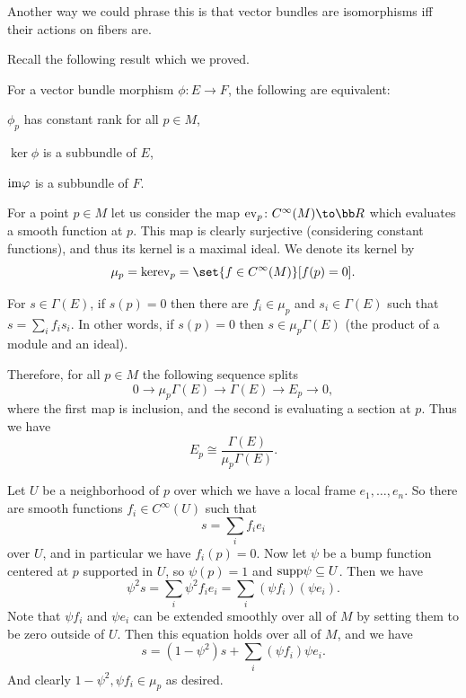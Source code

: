 \eproof

Another way we could phrase this is that vector bundles are isomorphisms iff their actions on fibers are.

Recall the following result which we proved.

\blemm

    For a vector bundle morphism $\phi\colon E\to F$, the following are equivalent:
    \benum
        \item $\phi_p$ has constant rank for all $p\in M$,
        \item $\ker\phi$ is a subbundle of $E$,
        \item ${\rm im}\varphi$ is a subbundle of $F$.
    \eenum

\elemm

For a point $p\in M$ let us consider the map $\ev_p\colon C^\infty(M)\to\bR$ which evaluates a smooth function at $p$.
This map is clearly surjective (considering constant functions), and thus its kernel is a maximal ideal.
We denote its kernel by
$$ \mu_p = \ker\ev_p = \set{f\in C^\infty(M)}[f(p)=0] . $$

\blemm

    For $s\in\Gamma(E)$, if $s(p)=0$ then there are $f_i\in\mu_p$ and $s_i\in\Gamma(E)$ such that $s=\sum_if_is_i$.
    In other words, if $s(p)=0$ then $s\in\mu_p\Gamma(E)$ (the product of a module and an ideal).

    Therefore, for all $p\in M$ the following sequence splits
    $$ 0 \to \mu_p\Gamma(E) \to \Gamma(E) \to E_p \to 0 , $$
    where the first map is inclusion, and the second is evaluating a section at $p$.
    Thus we have
    $$ E_p \cong \frac{\Gamma(E)}{\mu_p\Gamma(E)} . $$

\elemm

\bproof

    Let $U$ be a neighborhood of $p$ over which we have a local frame $e_1,\dots,e_n$.
    So there are smooth functions $f_i\in C^\infty(U)$ such that
    $$ s = \sum_i f_ie_i $$
    over $U$, and in particular we have $f_i(p)=0$.
    Now let $\psi$ be a bump function centered at $p$ supported in $U$, so $\psi(p)=1$ and ${\rm supp}\psi\subseteq U$.
    Then we have
    $$ \psi^2 s = \sum_i\psi^2 f_ie_i = \sum_i(\psi f_i)(\psi e_i) . $$
    Note that $\psi f_i$ and $\psi e_i$ can be extended smoothly over all of $M$ by setting them to be zero outside of $U$.
    Then this equation holds over all of $M$, and we have
    $$ s = (1-\psi^2)s + \sum_i(\psi f_i)\psi e_i . $$
    And clearly $1-\psi^2,\psi f_i\in\mu_p$ as desired.

